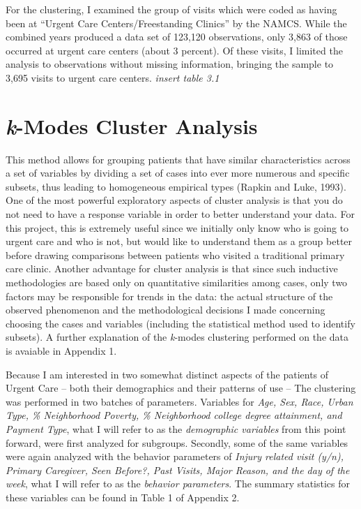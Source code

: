 \documentclass[12pt,twoside]{reedthesis}
\begin{document}
  For the clustering, I examined the group of visits which were coded as
  having been at ``Urgent Care Centers/Freestanding Clinics'' by the
  NAMCS. While the combined years produced a data set of 123,120
  observations, only 3,863 of those occurred at urgent care centers (about
  3 percent). Of these visits, I limited the analysis to observations
  without missing information, bringing the sample to 3,695 visits to
  urgent care centers. \emph{insert table 3.1}
  
  \section*{\texorpdfstring{\emph{k}-Modes Cluster
  Analysis}{k-Modes Cluster Analysis}}\label{k-modes-cluster-analysis}
  
  This method allows for grouping patients that have similar
  characteristics across a set of variables by dividing a set of cases
  into ever more numerous and specific subsets, thus leading to
  homogeneous empirical types (Rapkin and Luke, 1993). One of the most
  powerful exploratory aspects of cluster analysis is that you do not need
  to have a response variable in order to better understand your data. For
  this project, this is extremely useful since we initially only know who
  is going to urgent care and who is not, but would like to understand
  them as a group better before drawing comparisons between patients who
  visited a traditional primary care clinic. Another advantage for cluster
  analysis is that since such inductive methodologies are based only on
  quantitative similarities among cases, only two factors may be
  responsible for trends in the data: the actual structure of the observed
  phenomenon and the methodological decisions I made concerning choosing
  the cases and variables (including the statistical method used to
  identify subsets). A further explanation of the \emph{k}-modes
  clustering performed on the data is avaiable in Appendix 1.
  
  Because I am interested in two somewhat distinct aspects of the patients
  of Urgent Care -- both their demographics and their patterns of use --
  The clustering was performed in two batches of parameters. Variables for
  \emph{Age, Sex, Race, Urban Type, \% Neighborhood Poverty, \%
  Neighborhood college degree attainment, and Payment Type}, what I will
  refer to as the \emph{demographic variables} from this point forward,
  were first analyzed for subgroups. Secondly, some of the same variables
  were again analyzed with the behavior parameters of \emph{Injury related
  visit (y/n), Primary Caregiver, Seen Before?, Past Visits, Major Reason,
  and the day of the week}, what I will refer to as the \emph{behavior
  parameters}. The summary statistics for these variables can be found in
  Table 1 of Appendix 2.
  
\end{document}
